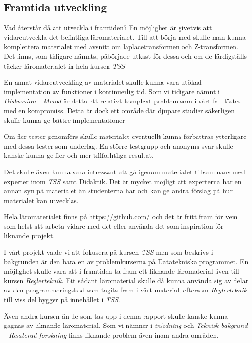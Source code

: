 \documentclass[]{article}
\begin{document}
\subsection{Framtida utveckling}
Vad återstår då att utveckla i framtiden? En möjlighet är givetvis att vidareutveckla det befintliga
läromaterialet. Till att börja med skulle man kunna komplettera materialet med avsnitt om laplacetransformen och Z-transformen. Det finns, som tidigare nämnts, påbörjade utkast för dessa och om de färdigställs täcker läromaterialet in hela kursen \textit{TSS}

En annat vidareutveckling av materialet skulle kunna vara utökad implementation av funktioner i kontinuerlig tid. Som vi tidigare nämnt i \textit{Diskussion - Metod} är detta ett relativt komplext problem som i vårt fall löstes med en kompromiss. Detta är dock ett område där djupare studier säkerligen skulle kunna ge bättre implementationer.

Om fler tester genomförs skulle materialet eventuellt kunna förbättras ytterligare med dessa tester som underlag.
En större testgrupp och anonyma svar skulle kanske kunna ge fler och mer tillförlitliga resultat.

Det skulle även kunna vara intressant att gå igenom materialet tillsammans med experter inom \textit{TSS} samt
Didaktik. Det är mycket möjligt att experterna har en annan syn på materialet än studenterna har och kan ge andra
förslag på hur materialet kan utvecklas.

Hela läromaterialet finns på \url{https://github.com/} och det är fritt fram för vem som helst att arbeta vidare
med det eller använda det som inspiration för liknande projekt.

I vårt projekt valde vi att fokusera på kursen \textit{TSS} men som beskrivs i bakgrunden är den bara en av problemkurserna på Datatekniska programmet. En möjlighet skulle vara att i framtiden ta fram ett liknande läromaterial även till kursen \textit{Reglerteknik}. Ett sådant läromaterial skulle då kunna använda sig av delar av den programmeringskod som tagits fram i vårt material, eftersom \textit{Reglerteknik} till viss del bygger på innehållet i \textit{TSS}.

Även andra kursen än de som tas upp i denna rapport skulle kanske kunna gagnas av liknande läromaterial. Som vi
nämner i \textit{inledning} och \textit{Teknisk bakgrund - Relaterad forskning} finns liknande problem även inom andra områden.
\end{document}
